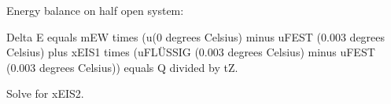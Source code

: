 Energy balance on half open system:

Delta E equals mEW times (u(0 degrees Celsius) minus uFEST (0.003 degrees Celsius) plus xEIS1 times (uFLÜSSIG (0.003 degrees Celsius) minus uFEST (0.003 degrees Celsius)) equals Q divided by tZ.

Solve for xEIS2.